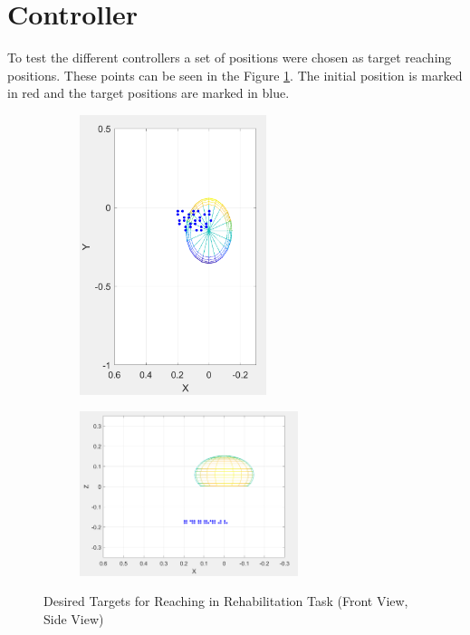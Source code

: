 \section{Controller}
To test the different controllers a set of positions were chosen as target reaching positions. These points can be seen in the Figure \ref{fig:desiredpoints}. The initial position is marked in red and the target positions are marked in blue.

\begin{figure}[h!] 
    \centering
    \begin{subfigure}[b]{0.45\linewidth}
        \includegraphics[width=0.6\textwidth]{Pictures/Results/Controller/DesiredPointsFV.png}
    \end{subfigure}
    \hfill
    \begin{subfigure}[b]{0.45\linewidth}            
        \includegraphics[width=0.7\textwidth]{Pictures/Results/Controller/DesiredPointsSV.png}
    \end{subfigure}
    \caption{Desired Targets for Reaching in Rehabilitation Task (Front View, Side View)}
    \label{fig:desiredpoints}
\end{figure}

